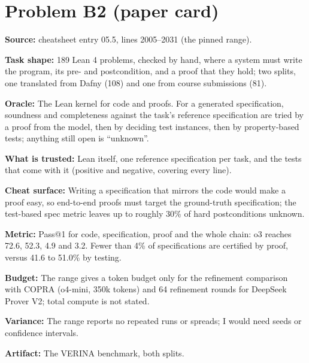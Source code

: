 \documentclass[11pt]{article}
\begin{document}
\section*{Problem B2 (paper card)}\label{ans:B2}
\begin{answer}
\textbf{Source:} cheatsheet entry 05.5, lines 2005--2031 (the pinned range).

\textbf{Task shape:} 189 Lean 4 problems, checked by hand, where a system must
write the program, its pre- and postcondition, and a proof that they hold; two
splits, one translated from Dafny (108) and one from course submissions (81).

\textbf{Oracle:} The Lean kernel for code and proofs. For a generated
specification, soundness and completeness against the task's reference
specification are tried by a proof from the model, then by deciding test
instances, then by property-based tests; anything still open is ``unknown''.

\textbf{What is trusted:} Lean itself, one reference specification per task,
and the tests that come with it (positive and negative, covering every line).

\textbf{Cheat surface:} Writing a specification that mirrors the code would
make a proof easy, so end-to-end proofs must target the ground-truth
specification; the test-based spec metric leaves up to roughly 30\% of hard
postconditions unknown.

\textbf{Metric:} Pass@1 for code, specification, proof and the whole chain:
o3 reaches 72.6, 52.3, 4.9 and 3.2. Fewer than 4\% of specifications are
certified by proof, versus 41.6 to 51.0\% by testing.

\textbf{Budget:} The range gives a token budget only for the refinement
comparison with COPRA (o4-mini, 350k tokens) and 64 refinement rounds for
DeepSeek Prover V2; total compute is not stated.

\textbf{Variance:} The range reports no repeated runs or spreads; I would need
seeds or confidence intervals.

\textbf{Artifact:} The VERINA benchmark, both splits.
\end{answer}
\end{document}
